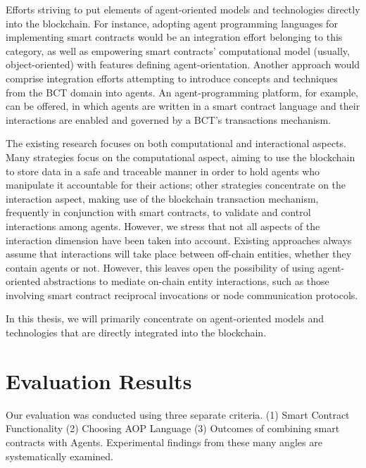 \vspace{.5cm}

Efforts striving to put elements of agent-oriented models and technologies directly into the blockchain.
For instance, adopting agent programming languages for implementing smart contracts would be an
integration effort belonging to this category, as well as empowering smart contracts’ computational
model (usually, object-oriented) with features defining agent-orientation. Another approach would comprise integration efforts attempting to introduce concepts and techniques from the \ac{BCT} domain into agents. An agent-programming platform, for example, can be offered, in which agents are written in a smart contract language and their interactions are enabled and governed by a \ac{BCT}'s transactions mechanism.


\vspace{.5cm}

The existing research focuses on both computational and interactional aspects. Many strategies focus on the computational aspect, aiming to use the blockchain to store data in a safe and traceable manner in order to hold agents who manipulate it accountable for their actions; other strategies concentrate on the interaction aspect, making use of the blockchain transaction mechanism, frequently in conjunction with smart contracts, to validate and control interactions among agents. However, we stress that not all aspects of the interaction dimension have been taken into account. Existing approaches always assume that interactions will take place between off-chain entities, whether they contain agents or not. However, this leaves open the possibility of using agent-oriented abstractions to mediate on-chain entity interactions, such as those involving smart contract reciprocal invocations or node communication protocols.

\vspace{.5cm}

In this thesis, we will primarily concentrate on agent-oriented models and technologies that are directly integrated into the blockchain.

\section{Evaluation Results}

Our evaluation was conducted using three separate criteria. (1) Smart Contract Functionality (2) Choosing \ac{AOP} Language (3) Outcomes of combining smart contracts with Agents. Experimental findings from these many angles are systematically examined.

